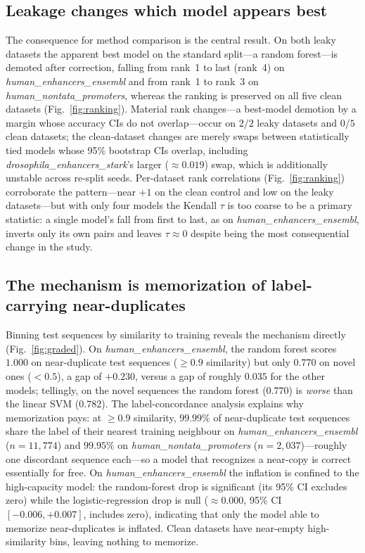 \documentclass[webpdf,modern,large,namedate]{oup-authoring-template}%
\begin{document}
\subsection{Leakage changes which model appears best}
The consequence for method comparison is the central result. On both leaky datasets the apparent best model on the standard split---a random forest---is demoted after correction, falling from rank~1 to last (rank~4) on \textit{human\_enhancers\_ensembl} and from rank~1 to rank~3 on \textit{human\_nontata\_promoters}, whereas the ranking is preserved on all five clean datasets (Fig.~\ref{fig:ranking}). Material rank changes---a best-model demotion by a margin whose accuracy CIs do not overlap---occur on $2/2$ leaky datasets and $0/5$ clean datasets; the clean-dataset changes are merely swaps between statistically tied models whose 95\% bootstrap CIs overlap, including \textit{drosophila\_enhancers\_stark}'s larger ($\approx0.019$) swap, which is additionally unstable across re-split seeds. Per-dataset rank correlations (Fig.~\ref{fig:ranking}) corroborate the pattern---near $+1$ on the clean control and low on the leaky datasets---but with only four models the Kendall $\tau$ is too coarse to be a primary statistic: a single model's fall from first to last, as on \textit{human\_enhancers\_ensembl}, inverts only its own pairs and leaves $\tau\approx0$ despite being the most consequential change in the study.

\subsection{The mechanism is memorization of label-carrying near-duplicates}
Binning test sequences by similarity to training reveals the mechanism directly (Fig.~\ref{fig:graded}). On \textit{human\_enhancers\_ensembl}, the random forest scores $1.000$ on near-duplicate test sequences ($\ge0.9$ similarity) but only $0.770$ on novel ones ($<0.5$), a gap of $+0.230$, versus a gap of roughly $0.035$ for the other models; tellingly, on the novel sequences the random forest ($0.770$) is \emph{worse} than the linear SVM ($0.782$). The label-concordance analysis explains why memorization pays: at $\ge0.9$ similarity, $99.99\%$ of near-duplicate test sequences share the label of their nearest training neighbour on \textit{human\_enhancers\_ensembl} ($n=11{,}774$) and $99.95\%$ on \textit{human\_nontata\_promoters} ($n=2{,}037$)---roughly one discordant sequence each---so a model that recognizes a near-copy is correct essentially for free. On \textit{human\_enhancers\_ensembl} the inflation is confined to the high-capacity model: the random-forest drop is significant (its 95\% CI excludes zero) while the logistic-regression drop is null ($\approx0.000$, 95\% CI $[-0.006, +0.007]$, includes zero), indicating that only the model able to memorize near-duplicates is inflated. Clean datasets have near-empty high-similarity bins, leaving nothing to memorize.
\end{document}
